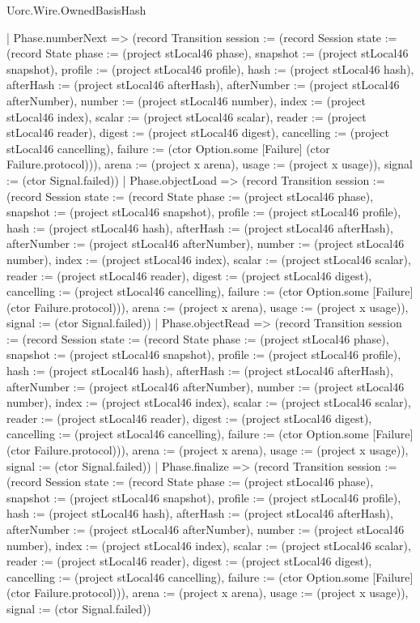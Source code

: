 \begin{lexlean}{Uorc.Wire.OwnedBasisHash}
\begin{semanticmodule}
{      | Phase.numberNext => (record Transition {session := (record Session {state := (record State {phase := (project stLocal46 phase), snapshot := (project stLocal46 snapshot), profile := (project stLocal46 profile), hash := (project stLocal46 hash), afterHash := (project stLocal46 afterHash), afterNumber := (project stLocal46 afterNumber), number := (project stLocal46 number), index := (project stLocal46 index), scalar := (project stLocal46 scalar), reader := (project stLocal46 reader), digest := (project stLocal46 digest), cancelling := (project stLocal46 cancelling), failure := (ctor Option.some [Failure] (ctor Failure.protocol))}), arena := (project x arena), usage := (project x usage)}), signal := (ctor Signal.failed)})
      | Phase.objectLoad => (record Transition {session := (record Session {state := (record State {phase := (project stLocal46 phase), snapshot := (project stLocal46 snapshot), profile := (project stLocal46 profile), hash := (project stLocal46 hash), afterHash := (project stLocal46 afterHash), afterNumber := (project stLocal46 afterNumber), number := (project stLocal46 number), index := (project stLocal46 index), scalar := (project stLocal46 scalar), reader := (project stLocal46 reader), digest := (project stLocal46 digest), cancelling := (project stLocal46 cancelling), failure := (ctor Option.some [Failure] (ctor Failure.protocol))}), arena := (project x arena), usage := (project x usage)}), signal := (ctor Signal.failed)})
      | Phase.objectRead => (record Transition {session := (record Session {state := (record State {phase := (project stLocal46 phase), snapshot := (project stLocal46 snapshot), profile := (project stLocal46 profile), hash := (project stLocal46 hash), afterHash := (project stLocal46 afterHash), afterNumber := (project stLocal46 afterNumber), number := (project stLocal46 number), index := (project stLocal46 index), scalar := (project stLocal46 scalar), reader := (project stLocal46 reader), digest := (project stLocal46 digest), cancelling := (project stLocal46 cancelling), failure := (ctor Option.some [Failure] (ctor Failure.protocol))}), arena := (project x arena), usage := (project x usage)}), signal := (ctor Signal.failed)})
      | Phase.finalize => (record Transition {session := (record Session {state := (record State {phase := (project stLocal46 phase), snapshot := (project stLocal46 snapshot), profile := (project stLocal46 profile), hash := (project stLocal46 hash), afterHash := (project stLocal46 afterHash), afterNumber := (project stLocal46 afterNumber), number := (project stLocal46 number), index := (project stLocal46 index), scalar := (project stLocal46 scalar), reader := (project stLocal46 reader), digest := (project stLocal46 digest), cancelling := (project stLocal46 cancelling), failure := (ctor Option.some [Failure] (ctor Failure.protocol))}), arena := (project x arena), usage := (project x usage)}), signal := (ctor Signal.failed)})
}
\end{semanticmodule}
\end{lexlean}
